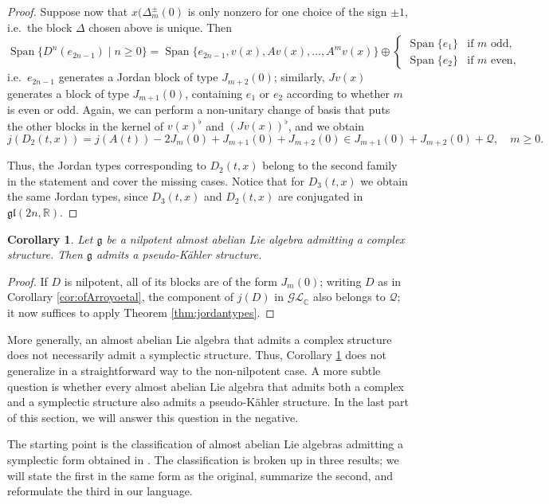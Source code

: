 \documentclass{article}
\newtheorem{corollary}[theorem]{Corollary}
\theoremstyle{definition}
\newcommand{\R}{\mathbb{R}}
\newcommand{\C}{\mathbb{C}}
\newcommand{\Span}[1]{\operatorname{Span}\{#1\}}
\newcommand{\lie}[1]{\mathfrak{#1}}
\newcommand{\g}{\lie g}
\newcommand{\gl}{\lie{gl}}
\begin{document}
\begin{proof}
    Suppose now that $x(\Delta^{\pm}_m(0)$ is only nonzero for one choice of the sign $\pm1$, i.e.\ the block $\Delta$ chosen above is unique. Then $$\Span{D^n(e_{2n-1})\mid n\geq0}=\Span{e_{2n-1},v(x), Av(x),\dotsc, A^{m}v(x)}\oplus\begin{cases}
        \Span{e_1}&\text{if }m\text{ odd},\\
        \Span{e_2}&\text{if }m\text{ even},
    \end{cases}$$ i.e.\ $e_{2n-1}$ generates a Jordan block of type $J_{m+2}(0)$; similarly, $Jv(x)$ generates a block of type $J_{m+1}(0)$, containing $e_1$ or $e_2$ according to whether $m$ is even or odd. Again, we can perform a non-unitary change of basis that puts the other blocks in the kernel of $v(x)^\flat$ and $(Jv(x))^\flat$, and we obtain $$j(D_2(t,x))=j(A(t))-2J_m(0)+J_{m+1}(0)+J_{m+2}(0)\in J_{m+1}(0)+J_{m+2}(0)+\mathcal{Q}, \quad m\geq0.$$

    Thus, the Jordan types corresponding to $D_2(t,x)$ belong to the second family in the statement and cover the missing cases. Notice that for $D_3(t,x)$ we obtain the same Jordan types, since $D_3(t,x)$ and $D_2(t,x)$ are conjugated in $\gl(2n,\R)$.
\end{proof}

\begin{corollary}\label{cor:complex_PK}
    Let $\g$ be a nilpotent almost abelian Lie algebra admitting a complex structure. Then $\g$ admits a pseudo-Kähler structure.
\end{corollary}

\begin{proof}
    If $D$ is nilpotent, all of its blocks are of the form $J_m(0)$; writing $D$ as in Corollary \ref{cor:ofArroyoetal}, the component of $j(D)$ in $\mathcal{GL}_\C$ also belongs to $\mathcal{Q}$; it now suffices to apply Theorem \ref{thm:jordantypes}.
\end{proof}

More generally, an almost abelian Lie algebra that admits a complex structure does not necessarily admit a symplectic structure. Thus, Corollary \ref{cor:complex_PK} does not generalize in a straightforward way to the non-nilpotent case. A more subtle question is whether every almost abelian Lie algebra that admits both a complex and a symplectic structure also admits a pseudo-Kähler structure. In the last part of this section, we will answer this question in the negative.\medskip

The starting point is the classification of almost abelian Lie algebras admitting a symplectic form obtained in \cite{ArroyoBarberisDiazGodoyHernandez}. The classification is broken up in three results; we will state the first in the same form as the original, summarize the second, and reformulate the third in our language.
\end{document}
